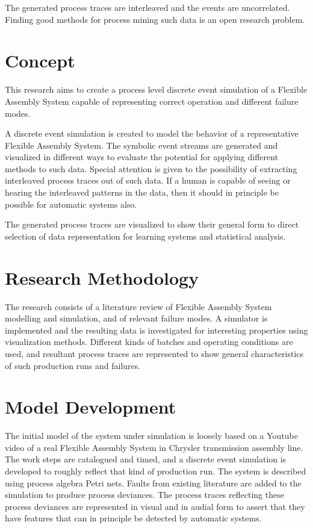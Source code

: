 \documentclass[a4paper,10pt]{article}
\begin{document}
The generated process traces are interleaved and the events are uncorrelated. Finding good methods for process mining such data is an open research problem.

\section{Concept}

This research aims to create a process level discrete event simulation of a Flexible Assembly System capable of representing correct operation and different failure modes.

A discrete event simulation is created to model the behavior of a representative Flexible Assembly System. The symbolic event streams are generated and visualized in different ways
to evaluate the potential for applying different methods to such data. Special attention is given to the possibility of extracting interleaved process traces out of such data.
If a human is capable of seeing or hearing the interleaved patterns in the data, then it should in principle be possible for automatic systems also.

The generated process traces are visualized to show their general form to direct selection of data representation for learning systems and statistical analysis.

\section{Research Methodology}

The research consists of a literature review of Flexible Assembly System modelling and simulation, and of relevant failure modes.
A simulator is implemented and the resulting data is investigated for interesting properties using visualization methods.
Different kinds of batches and operating conditions are used, and resultant process traces are represented to show general characteristics of such production runs and failures.

\section{Model Development}

The initial model of the system under simulation is loosely based on a Youtube video\cite{transmission} of a real Flexible Assembly System in Chrysler transmission assembly line.
The work steps are catalogued and timed, and a discrete event simulation
is developed to roughly reflect that kind of production run. The system is described using process algebra Petri nets.
Faults from existing literature are added to the simulation to produce process deviances.
The process traces reflecting these process deviances are represented in visual and in audial form to assert that they have features that can in principle be detected
by automatic systems.
\end{document}
